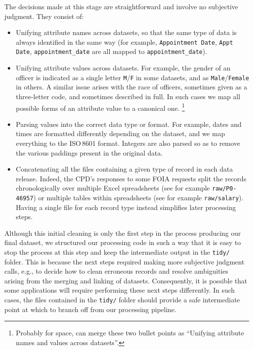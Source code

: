 The decisions made at this stage are straightforward and involve no subjective
judgment. They consist of:
\begin{itemize}
	\item Unifying attribute names across datasets, so that the same type of
		data is always identified in the same way (for example,
		\texttt{Appointment Date}, \texttt{Appt Date},
		\texttt{appointment\_date} are all mapped to
		\texttt{appointment\_date}).
	\item Unifying attribute values across datasets. For example, the gender of
		an officer is indicated as a single letter \texttt{M}/\texttt{F} in
		some datasets, and as \texttt{Male}/\texttt{Female} in others. A similar issue
		arises with the race of officers, sometimes given as a three-letter
		code, and sometimes described in full. In such cases we map all
		possible forms of an attribute value to a canonical one. \footnote{Probably for space, can merge these two bullet points as ``Unifying attribute names and values across datasets''.}
	\item Parsing values into the correct data type or format. For example,
		dates and times are formatted differently depending on the dataset, and
		we map everything to the ISO\,8601 format. Integers are also parsed so
		as to remove the various paddings present in the original data.
	\item Concatenating all the files containing a given type of record in each
		data release. Indeed, the CPD's responses to some FOIA requests split
		the records chronologically over multiple Excel spreadsheets (see for
		example \texttt{raw/P0-46957}) or multiple tables within spreadsheets
                (see for example \texttt{raw/salary}). Having a single file for each record
		type instead simplifies later processing steps.
\end{itemize}

Although this initial cleaning is only the first step in the process producing
our final dataset, we structured our processing code in such a way that it is
easy to stop the process at this step and keep the intermediate output in the
\texttt{tidy/} folder. This is because the next steps required making more
subjective judgment calls, e.g., to decide how to clean erroneous records and resolve
ambiguities arising from the merging and linking of datasets. Consequently, it
is possible that some applications will require performing these next steps
differently. In such cases, the files contained in the \texttt{tidy/} folder
should provide a safe intermediate point at which to branch off from our
processing pipeline.

